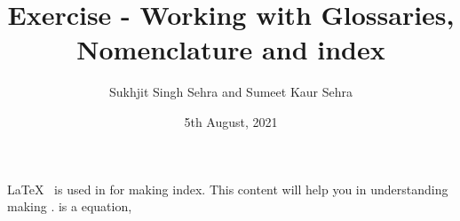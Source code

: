 \documentclass[11pt,a4paper]{article}
\title{Exercise - Working with Glossaries, Nomenclature and index}
\author{Sukhjit Singh Sehra and Sumeet Kaur Sehra}
\date{5th August, 2021}
\begin{document}
\tableofcontents
\maketitle

\LaTeX\ \index{\LaTeX} is used in for making index. This content will help you in understanding making .  is a equation,

\printindex
\end{document}
